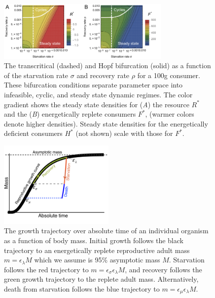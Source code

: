 \documentclass[11pt]{article}
\begin{document}
\begin{figure}
\centering
\includegraphics[width=0.75\textwidth]{fig_FixedPoint.pdf}
\caption{ The transcritical (dashed) and Hopf bifurcation (solid) as a
  function of the starvation rate $\sigma$ and recovery rate $\rho$ for a 100g consumer.  These
  bifurcation conditions separate parameter space into infeasible, cyclic,
  and steady state dynamic regimes.  The color gradient shows the steady
  state densities for (\emph{A}) the resource $R^*$ and the (\emph{B}) energetically
  replete consumers $F^*$, (warmer colors denote higher densities).  Steady
  state densities for the energetically deficient consumers $H^*$ (not shown)
  scale with those for $F^*$.  }
\label{fig:fp}
\end{figure}


\begin{figure}
\centering
\includegraphics[width=0.5\textwidth]{Growth-trajectory-diagram.pdf}
\caption{ The growth trajectory over absolute time of an individual organism
  as a function of body mass.  Initial growth follows the black trajectory to
  an energetically replete reproductive adult mass $m=\epsilon_\lambda M$ which we assume is 95\% asymptotic mass $M$.  Starvation follows the red
  trajectory to $m = \epsilon_\sigma \epsilon_\lambda  M$, and recovery follows the
  green growth trajectory to the replete adult mass. Alternatively, death from starvation follows the blue trajectory to $m=\epsilon_\mu \epsilon_\lambda  M$.}
\label{fig:growth}
\end{figure}
\end{document}
